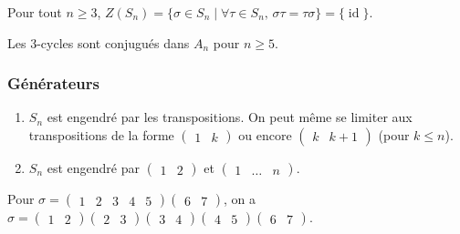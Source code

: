 
  \begin{proposition}
    Pour tout $n \geq 3$, $Z(S_n) = \{ \sigma \in S_n \mid \forall \tau \in S_n, \, \sigma \tau = \tau \sigma \} = \{ \operatorname{id} \}$.
  \end{proposition}


  \begin{lemma}
    Les $3$-cycles sont conjugués dans $A_n$ pour $n \geq 5$.
  \end{lemma}

  \subsubsection{Générateurs}


  \begin{proposition}
    \begin{enumerate}[label=(\roman*)]
      \item $S_n$ est engendré par les transpositions. On peut même se limiter aux transpositions de la forme $\begin{pmatrix} 1 & k \end{pmatrix}$ ou encore  $\begin{pmatrix} k & k+1 \end{pmatrix}$ (pour $k \leq n$).
      \item $S_n$ est engendré par $\begin{pmatrix} 1 & 2 \end{pmatrix}$ et $\begin{pmatrix} 1 & \dots & n \end{pmatrix}$.
    \end{enumerate}
  \end{proposition}

  \begin{example}
    Pour $\sigma = \begin{pmatrix} 1 & 2 & 3 & 4 & 5 \end{pmatrix}\begin{pmatrix} 6 & 7 \end{pmatrix}$, on a $\sigma = \begin{pmatrix} 1 & 2 \end{pmatrix} \begin{pmatrix} 2 & 3 \end{pmatrix} \begin{pmatrix} 3 & 4 \end{pmatrix} \begin{pmatrix} 4 & 5 \end{pmatrix} \begin{pmatrix} 6 & 7 \end{pmatrix}$.
  \end{example}


